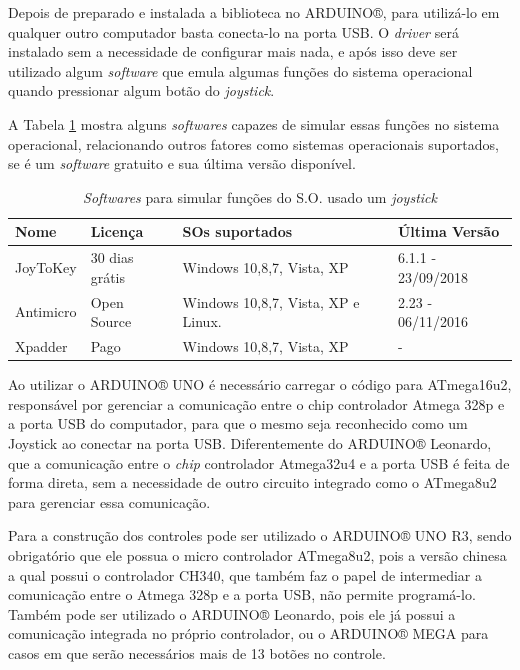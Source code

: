 \documentclass[
	12pt,			%
	openright,		%
	oneside,			%
	a4paper,			%
	chapter=TITLE,		%
	english,			%
	brazil,			%
	]{abntex2}
\begin{document}
Depois de preparado e instalada a biblioteca no ARDUINO®, para utilizá-lo em qualquer outro computador basta conecta-lo na porta USB. O \emph{driver} será instalado sem a necessidade de configurar mais nada, e após isso deve ser utilizado algum \emph{software} que emula algumas funções do sistema operacional quando pressionar algum botão do \emph{joystick}.

A Tabela \ref{tab:tab-3} mostra alguns \emph{softwares} capazes de simular essas funções no sistema operacional, relacionando outros fatores como sistemas operacionais suportados, se é um \emph{software} gratuito e sua última versão disponível.

\begin{table}[H]
\caption{\emph{Softwares} para simular funções do S.O. usado um \emph{joystick}}
\label{tab:tab-3}
{
\centering
\footnotesize
\begin{tabular}{|p{2cm}|p{3cm}|p{6cm}|p{3cm}|}
\hline
\textbf{Nome} & \textbf{Licença} & \textbf{SOs suportados} & \textbf{Última Versão}\\
\hline
JoyToKey	&30 dias grátis				&Windows 10,8,7, Vista, XP		&6.1.1 - 23/09/2018\\
\hline
Antimicro	&Open Source				&Windows 10,8,7, Vista, XP e Linux.	&2.23 - 06/11/2016\\
\hline
Xpadder	&Pago						&Windows 10,8,7, Vista, XP 		&-\\
\hline
\end{tabular}
}
\end{table}

Ao utilizar o ARDUINO® UNO é necessário carregar o código para ATmega16u2, responsável por gerenciar a comunicação entre o chip controlador Atmega 328p e a porta USB do computador, para que o mesmo seja reconhecido como um Joystick ao conectar na porta USB. Diferentemente do ARDUINO® Leonardo, que a comunicação entre o \emph{chip} controlador Atmega32u4 e a porta USB é feita de forma direta, sem a necessidade de outro circuito integrado como o ATmega8u2 para gerenciar essa comunicação.

Para a construção dos controles pode ser utilizado o ARDUINO® UNO R3, sendo obrigatório que ele possua o micro controlador ATmega8u2, pois a versão chinesa a qual possui o controlador CH340, que também faz o papel de intermediar a comunicação entre o Atmega 328p e a porta USB, não permite programá-lo. Também pode ser utilizado o ARDUINO® Leonardo, pois ele já possui a comunicação integrada no próprio controlador, ou o ARDUINO® MEGA para casos em que serão necessários mais de 13 botões no controle.
\end{document}
